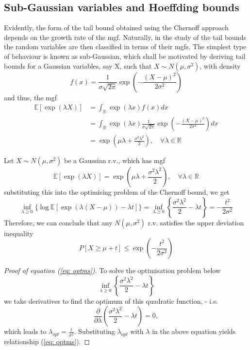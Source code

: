 \documentclass[10pt,handout,english]{beamer}
\newcommand{\E}{\mathbb{E}}
\newcommand{\R}{\mathbb{R}}
\newcommand{\1}{\mathbbm{1}}
\begin{document}
\subsection{Sub-Gaussian variables and Hoeffding bounds}

\begin{frame}[allowframebreaks]
Evidently, the form of the tail bound obtained using the Chernoff approach depends on the growth rate of the mgf. Naturally, in the study of the tail bounds the random variables are then classified in terms of their mgfs. The simplest type of behaviour is known as sub-Gaussian, which shall be motivated by deriving tail bounds for a Gaussian variables, say X, such that $X\sim N(\mu,\sigma^2)$, with density
\[
f(x)=\frac{1}{\sigma\sqrt{2\pi}}\exp\left(-\frac{(X-\mu)^2}{2\sigma^2}\right)
\]
and thus, the mgf
\begin{align*}
\E[\exp(\lambda X)]&=\int_{\R}\exp(\lambda x)f(x)dx\\
&=\int_{\R}\exp(\lambda x)\frac{1}{\sigma\sqrt{2\pi}}\exp\left(-\frac{(X-\mu)^2}{2\sigma^2}\right)dx\\
&=\exp\left(\mu\lambda+\frac{\sigma^2\lambda^2}{2}\right),\quad\forall\lambda\in\R
\end{align*}
\begin{example}
Let $X\sim N(\mu,\sigma^2)$ be a Gaussian r.v., which has mgf
\[
\E[\exp(\lambda X)]=\exp\left(\mu\lambda+\frac{\sigma^2\lambda^2}{2}\right),\quad \forall \lambda\in \R
\]
substituting this into the optimising problem of the Chernoff bound, we get
\begin{equation}\label{eq: optms}
\inf_{\lambda\geq 0}\{\log\E[\exp(\lambda(X-\mu))-\lambda t]\}=\inf_{\lambda\geq 0}\left\{\frac{\sigma^2\lambda^2}{2}-\lambda t\right\}=-\frac{t^2}{2\sigma^2}
\end{equation}
Therefore, we can conclude that any $N(\mu,\sigma^2)$ r.v. satisfies the upper deviation inequality
\begin{equation}\label{eq: Sub-Gaussian TB}
P[X\geq\mu+t]\leq\exp\left(-\frac{t^2}{2\sigma^2}\right)
\end{equation}
\end{example}
\end{frame}
\begin{frame}
\begin{proof}[Proof of equation (\ref{eq: optms})]
To solve the optimisation problem below 
\[
\inf_{\lambda\geq 0}\left\{\frac{\sigma^2\lambda^2}{2}-\lambda t\right\}
\]
we take derivatives to find the optimum of this quadratic function, - i.e.
\[
\frac{\partial}{\partial\lambda}\left(\frac{\sigma^2\lambda^2}{2}-\lambda t\right)=0,
\]
which leads to $\lambda_{opt}=\frac{t}{\sigma^2}$. Substituting $\lambda_{opt}$ with $\lambda$ in the above equation yields relationship (\ref{eq: optms}).
\end{proof}
\end{frame}
\end{document}
